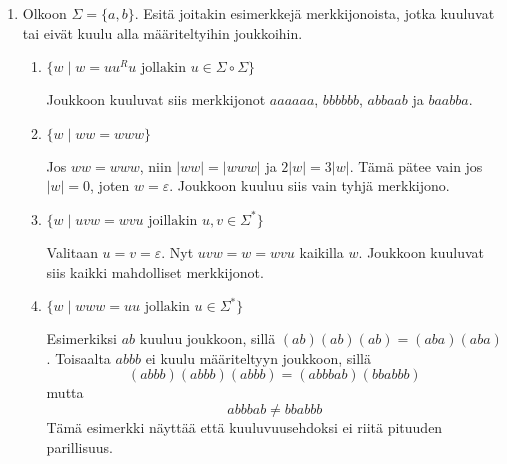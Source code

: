 \documentclass[a4paper,11pt,draft]{article}
\newtheorem*{claim}{Väite}
\begin{document}
\begin{enumerate}
\begin{enumerate}
  \item
    \begin{claim}
      Kaikilla kielillä $L$, $\emptyset \circ L = L \circ \emptyset = \emptyset$.
    \end{claim}
    \begin{proof}
      Jos $uv \in \emptyset \circ L$, niin $u \in \emptyset$. Koska
      tyhjässä joukossa ei ole yhtään alkiota, niin myös $\emptyset
      \circ L$ on tyhjä joukko. Vastaavasti tapauksella $L \circ
      \emptyset$. Siis $\emptyset \circ L = L \circ \emptyset =
      \emptyset$.
    \end{proof}
  \end{enumerate}

\item
  Olkoon $\Sigma = \{a,b\}$. Esitä joitakin esimerkkejä
  merkkijonoista, jotka kuuluvat tai eivät kuulu alla määriteltyihin
  joukkoihin.
  \begin{enumerate}
  \item
    $\{w \mid w = uu^Ru \text{ jollakin } u \in \Sigma \circ
    \Sigma\}$

    Joukkoon kuuluvat siis merkkijonot $aaaaaa$, $bbbbbb$, $abbaab$
    ja $baabba$.
  \item
    $\{w \mid ww = www\}$

    Jos $ww = www$, niin $|ww| = |www|$ ja $2|w| = 3|w|$.
    Tämä pätee vain jos $|w| = 0$, joten $w = \varepsilon$. Joukkoon
    kuuluu siis vain tyhjä merkkijono.
  \item
    $\{w \mid uvw = wvu \text{ joillakin } u,v \in \Sigma^*\}$

    Valitaan $u = v = \varepsilon$. Nyt $uvw = w = wvu$ kaikilla
    $w$. Joukkoon kuuluvat siis kaikki mahdolliset merkkijonot.
  \item
    $\{w \mid www = uu \text{ jollakin } u \in \Sigma^*\}$

    Esimerkiksi $ab$ kuuluu joukkoon, sillä $(ab)(ab)(ab) =
    (aba)(aba)$. Toisaalta $abbb$ ei kuulu määriteltyyn joukkoon,
    sillä
    \begin{equation*}
    (abbb)(abbb)(abbb) = (abbbab)(bbabbb)
    \end{equation*}
    mutta
    \begin{equation*}
      abbbab \neq bbabbb
    \end{equation*}
    Tämä esimerkki näyttää että kuuluvuusehdoksi ei riitä pituuden
    parillisuus.
  \end{enumerate}


\end{enumerate}
\end{document}
